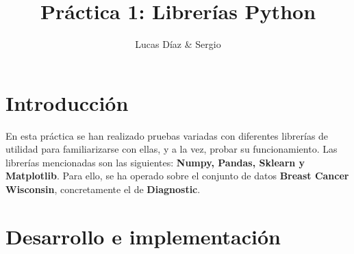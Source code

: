 \documentclass{llncs}
\begin{document}
\title{Práctica 1: Librerías Python}

\author{Lucas Díaz \& Sergio}

\maketitle 

\section{Introducción}

{En esta práctica se han realizado pruebas variadas con diferentes librerías de utilidad para familiarizarse con ellas, y a la vez, probar su funcionamiento. Las librerías mencionadas son las siguientes: \textbf{Numpy, Pandas, Sklearn y Matplotlib}. 
Para ello, se ha operado sobre el conjunto de datos \textbf{Breast Cancer Wisconsin}, concretamente el de \textbf{Diagnostic}.}


\section{Desarrollo e implementación}
\end{document}
